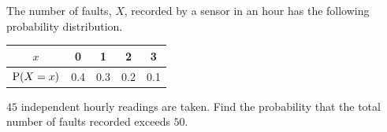 \begin{minipage}[t]{0.48\textwidth}
\exlab The number of faults, $X$, recorded by a sensor in an hour has the following probability distribution.
\begin{center}\ba\small\begin{tabular}{|c|c|c|c|c|}\hline
$x$&0&1&2&3\\\hline
$\mathrm{P}(X=x)$&0.4&0.3&0.2&0.1\\\hline
\end{tabular}\end{center}
$45$ independent hourly readings are taken. Find the probability that the total number of faults recorded exceeds $50$.
\end{minipage}
